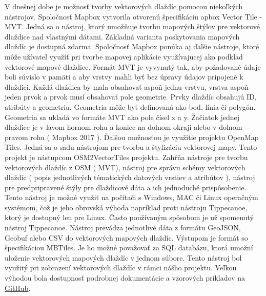 \documentclass[12pt]{article}
\begin{document}
 V dnešnej dobe je možnosť tvorby vektorových dlaždíc pomocou niekoľkých nástrojov. 
\newline Spoločnosť Mapbox vytvorila otvorenú špecifikáciu apbox Vector Tile - MVT. Jedná sa o nástroj, ktorý umožňuje tvorbu mapových štýlov pre vektorové dlaždice nad vlastnými dátami. Základná varianta poskytovania mapových dlaždíc je dostupná zdarma. Spoločnosť Mapbox ponúka aj ďalšie nástroje, ktoré môže užívateľ využíť pri tvorbe mapovej aplikácie využívajucej ako podklad vektorové mapové dlaždice. Formát MVT je vyvynutý tak, aby požadované údaje boli súvislo v pamäti a aby vrstvy mahli byť bez úpravy údajov pripojené k dlaždici. Každá dlaždica by mala obsahovať aspoň jednu vrstvu, vrstva aspoň jeden prvok a prvok musí obsahovať pole geometrie. Prvky dlaždíc obsahujú ID, atribúty a geometriu. Geometria môže byť definovaná ako bod, línia či polygón. Geometria sa ukladá vo formáte MVT ako pole čísel x a y. Žačiatok jednej dlaždice je  v ľavom hornom rohu a koniec na dolnom okraji alebo v dolnom pravom rohu ( Mapbox 2017 ).
\newline Ďalšou možnosťou je využitie projektu OpenMap Tiles. Jedná sa o sadu nástrojom pre tvorbu a štylizáciu vektorovej mapy. Tento projekt je nástupcom OSM2VectorTiles projektu. Zahŕňa nástroje pre tvorbu vektorových dlaždíc z OSM ( MVT), nástroj pre správu schémy vektorových dlaždíc ( popis jednotlivých tématických datových vrstiev a atribútov ), nástroj pre predpripravené štýly pre dlaždicové dáta a ich jednoduché prispôsobenie. Tento nástroj je možné využiť na počítači s Windows, MAC či Linux operačným systémom, čož je jeho obrovská výhoda napríklad proti nástroju Tippecanoe, ktorý je dostupný len pre Linux.  
\newline Často používaným spôsobom je už spomenutý nástroj Tippecanoe. Nástroj prevádza jednotlivé dáta z formátu GeoJSON, Geobuf alebo CSV do vektorových mapových dlaždíc. Výstupom je formát so špecifikáciou MBTiles. Je ho možné považovať za SQL databázu, ktorá umožní uloženie vektorových mapových dlaždíc v jednom súbore. Tento nástroj bol využitý pri zobrazení vektorových dlaždíc v rámci nášho projektu. Veľkou výhodou bola dostupnosť podrobnej dokumentácie a vzorových príkladov na  \href{https://github.com/mapbox/tippecanoe}{ GitHub}.
\end{document}

